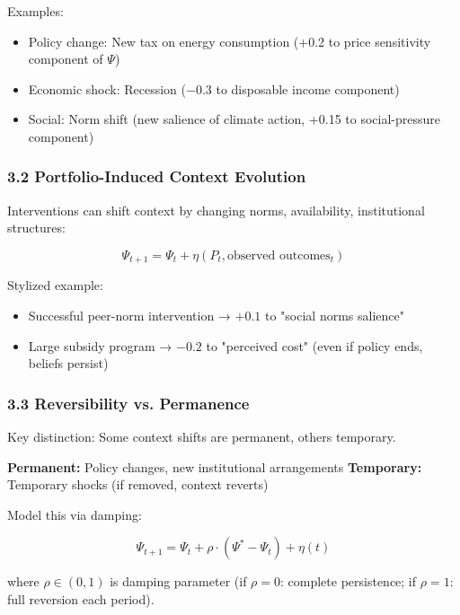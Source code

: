 Examples:
\begin{itemize}[nosep]
\item Policy change: New tax on energy consumption (+0.2 to price sensitivity component of $\Psi$)
\item Economic shock: Recession (−0.3 to disposable income component)
\item Social: Norm shift (new salience of climate action, +0.15 to social-pressure component)
\end{itemize}

\subsubsection*{3.2 Portfolio-Induced Context Evolution}

Interventions can shift context by changing norms, availability, institutional structures:

\begin{equation}
\Psi_{t+1} = \Psi_t + \eta(P_t, \text{observed outcomes}_t)
\label{eq:kkk-context-intervention}
\end{equation}

Stylized example:
\begin{itemize}[nosep]
\item Successful peer-norm intervention → $+0.1$ to "social norms salience"
\item Large subsidy program → $-0.2$ to "perceived cost" (even if policy ends, beliefs persist)
\end{itemize}

\subsubsection*{3.3 Reversibility vs. Permanence}

Key distinction: Some context shifts are permanent, others temporary.

\textbf{Permanent:} Policy changes, new institutional arrangements
\textbf{Temporary:} Temporary shocks (if removed, context reverts)

Model this via damping:

\begin{equation}
\Psi_{t+1} = \Psi_t + \rho \cdot (\Psi^* - \Psi_t) + \eta(t)
\label{eq:kkk-context-reversion}
\end{equation}

where $\rho \in (0,1)$ is damping parameter (if $\rho=0$: complete persistence; if $\rho=1$: full reversion each period).

